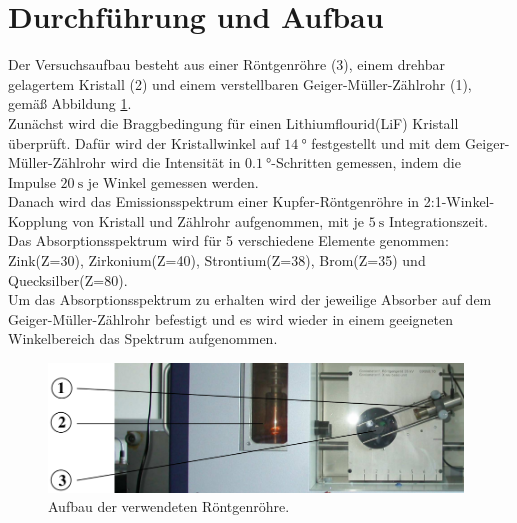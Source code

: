 \section{Durchführung und Aufbau}
\label{sec:Aufbau}
Der Versuchsaufbau besteht aus einer Röntgenröhre (3), einem drehbar gelagertem
Kristall (2) und einem verstellbaren Geiger-Müller-Zählrohr (1),
gemäß Abbildung \ref{fig:röntgen}.
\\
Zunächst wird die Braggbedingung für einen Lithiumflourid(LiF) Kristall
überprüft. Dafür wird der Kristallwinkel auf $\SI{14}{\degree}$
festgestellt und mit dem Geiger-Müller-Zählrohr wird die Intensität in
$\SI{0.1}{\degree}$-Schritten gemessen, indem die Impulse
$\SI{20}{\second}$ je Winkel gemessen werden.
\\
Danach wird das Emissionsspektrum einer Kupfer-Röntgenröhre in 2:1-Winkel-Kopplung
von Kristall und Zählrohr aufgenommen, mit je $\SI{5}{\second}$ Integrationszeit.
\\
Das Absorptionsspektrum wird für 5 verschiedene Elemente genommen:\\
Zink(Z=30), Zirkonium(Z=40), Strontium(Z=38), Brom(Z=35) und Quecksilber(Z=80).\\
Um das Absorptionsspektrum zu erhalten wird der jeweilige Absorber auf dem
Geiger-Müller-Zählrohr befestigt und es wird wieder in einem geeigneten
Winkelbereich das Spektrum aufgenommen.

\begin{figure}
    \centering
    \includegraphics[width=11cm]{content/roentgenklein.png}
    \caption{Aufbau der verwendeten Röntgenröhre. \cite{Anleitung}}
    \label{fig:röntgen}
\end{figure}

